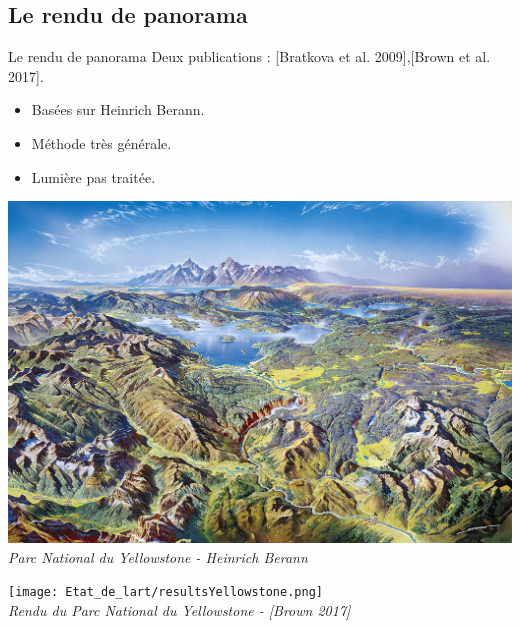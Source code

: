 \documentclass{beamer}
\begin{document}
\subsection*{Le rendu de panorama} 
\begin{frame}{Le rendu de panorama}
Deux publications : [Bratkova et al. 2009],[Brown et al. 2017].
\begin{itemize}
\item Basées sur Heinrich Berann. 
\item Méthode très générale. 
\item Lumière pas traitée.
\end{itemize}	


\begin{center}
    \begin{minipage}[c]{0.45\linewidth}
    \begin{center}
    	\includegraphics[width=1.0\linewidth]{Images/yellowstone_small.jpg}\\
 		\textit{Parc National du Yellowstone - Heinrich Berann}
    \end{center}
    \end{minipage}
    \hspace{0.2cm}
    \begin{minipage}[c]{0.45\linewidth}
    \begin{center}
    	\texttt{[image: Etat\_de\_lart/resultsYellowstone.png]}\\
 		\textit{Rendu du Parc National du Yellowstone - [Brown 2017]}
    \end{center}
    \end{minipage}
\end{center}


\end{frame}
\end{document}
